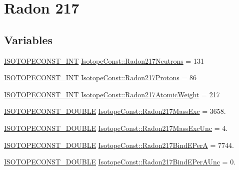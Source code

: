 \hypertarget{group___isotope_const-_radon-_rn217}{}\section{Radon 217}
\label{group___isotope_const-_radon-_rn217}
\subsection*{Variables}
\begin{DoxyCompactItemize}
\item 
\mbox{\hyperlink{group___isotope_const-_macros_ga5f18360b3e99483a35c32d789e62621c}{I\+S\+O\+T\+O\+P\+E\+C\+O\+N\+S\+T\+\_\+\+I\+NT}} \mbox{\hyperlink{group___isotope_const-_radon-_rn217_ga33720690012084f10b9fd8ee3747702c}{Isotope\+Const\+::\+Radon217\+Neutrons}} = 131
\item 
\mbox{\hyperlink{group___isotope_const-_macros_ga5f18360b3e99483a35c32d789e62621c}{I\+S\+O\+T\+O\+P\+E\+C\+O\+N\+S\+T\+\_\+\+I\+NT}} \mbox{\hyperlink{group___isotope_const-_radon-_rn217_ga5e4c9bdca13b959870d5fe44dda83c33}{Isotope\+Const\+::\+Radon217\+Protons}} = 86
\item 
\mbox{\hyperlink{group___isotope_const-_macros_ga5f18360b3e99483a35c32d789e62621c}{I\+S\+O\+T\+O\+P\+E\+C\+O\+N\+S\+T\+\_\+\+I\+NT}} \mbox{\hyperlink{group___isotope_const-_radon-_rn217_gad5a6bd05b125862de3af0b0ea5c337b9}{Isotope\+Const\+::\+Radon217\+Atomic\+Weight}} = 217
\item 
\mbox{\hyperlink{group___isotope_const-_macros_ga8f45a7272ce02c0b4c65c44636ed719a}{I\+S\+O\+T\+O\+P\+E\+C\+O\+N\+S\+T\+\_\+\+D\+O\+U\+B\+LE}} \mbox{\hyperlink{group___isotope_const-_radon-_rn217_ga90bbb422bd7c6ce22baed317e89ea071}{Isotope\+Const\+::\+Radon217\+Mass\+Exc}} = 3658.
\item 
\mbox{\hyperlink{group___isotope_const-_macros_ga8f45a7272ce02c0b4c65c44636ed719a}{I\+S\+O\+T\+O\+P\+E\+C\+O\+N\+S\+T\+\_\+\+D\+O\+U\+B\+LE}} \mbox{\hyperlink{group___isotope_const-_radon-_rn217_ga84bf0dd699489b8e01f370e1e3010f4c}{Isotope\+Const\+::\+Radon217\+Mass\+Exc\+Unc}} = 4.
\item 
\mbox{\hyperlink{group___isotope_const-_macros_ga8f45a7272ce02c0b4c65c44636ed719a}{I\+S\+O\+T\+O\+P\+E\+C\+O\+N\+S\+T\+\_\+\+D\+O\+U\+B\+LE}} \mbox{\hyperlink{group___isotope_const-_radon-_rn217_ga01836196807894d42464d7e8a062b14e}{Isotope\+Const\+::\+Radon217\+Bind\+E\+PerA}} = 7744.
\item 
\mbox{\hyperlink{group___isotope_const-_macros_ga8f45a7272ce02c0b4c65c44636ed719a}{I\+S\+O\+T\+O\+P\+E\+C\+O\+N\+S\+T\+\_\+\+D\+O\+U\+B\+LE}} \mbox{\hyperlink{group___isotope_const-_radon-_rn217_gacabcc8831942615c37dae6fe190654f2}{Isotope\+Const\+::\+Radon217\+Bind\+E\+Per\+A\+Unc}} = 0.

\end{DoxyCompactItemize}
